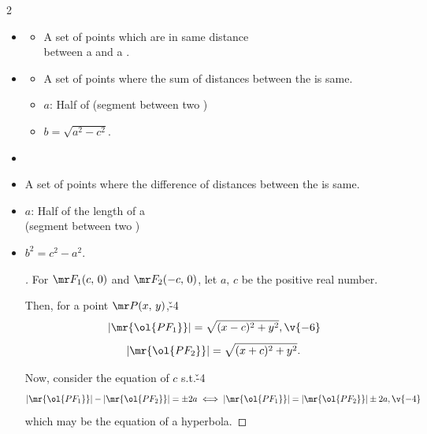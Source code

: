 \documentclass[dvipdfmx,a4paper,titlepage,9pt]{jsarticle}
\begin{document}
\begin{multicols*}{2}
\begin{itemize}
\item[-] 
\begin{itemize}
\setlength{\leftskip}{-10pt}
\item[:] A set of points which are in same distance \\
         between a  and a . \\
\end{itemize}
\item[-] 
\begin{itemize}
\setlength{\leftskip}{-5pt}
\item[:] A set of points where the sum of distances between the  is same. 
\item[$\cdot$] $a$: Half of (segment between two )
\item[$\cdot$] $b=\sqrt{a^2-c^2}$. \\
\end{itemize}

\vfill\null\columnbreak

\item[-] 
\item[:] A set of points where the difference of distances between the  is same.
\item[$\cdot$] $a$: Half of the length of a  \\
\;\;\;\;(segment between two )
\item[$\cdot$] $b^2=c^2-a^2$.

\begin{pfbox}
\begin{proof}[]
For $\mr F_1(c,\,0)$ and $\mr F_2(-c,\,0)$, let $a,\,c$ be the positive real number.

Then, for a point $\mr P(x,\,y)$,\v{-4}
$$|\mr{\ol{PF_1}}|=\sqrt{(x-c)^2+y^2},\v{-6}$$
$$|\mr{\ol{PF_2}}|=\sqrt{(x+c)^2+y^2}.$$

Now, consider the equation of $c$ s.t.\v{-4}
$$|\mr{\ol{PF_1}}|-|\mr{\ol{PF_2}}|=\pm 2a\iff|\mr{\ol{PF_1}}|=|\mr{\ol{PF_2}}|\pm 2a,\v{-4}$$
which may be the equation of a hyperbola.


\end{proof}
\end{pfbox}
\end{itemize}
\end{multicols*}
\end{document}
